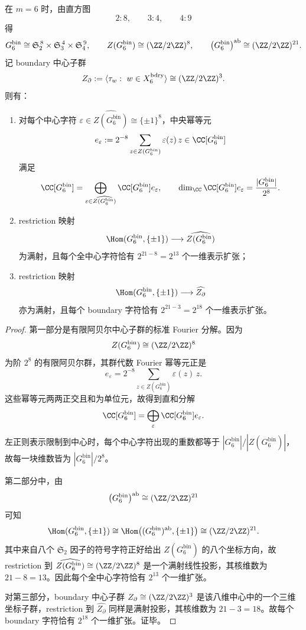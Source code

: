 \begin{theorem}\label{thm:conclusion-window6-full-center-fourier-blocks-and-extensions}
在 \(m=6\) 时，由直方图
\[
2:8,\qquad 3:4,\qquad 4:9
\]
得
\[
G_6^{\mathrm{bin}}\cong \mathfrak S_2^{\,8}\times \mathfrak S_3^{\,4}\times \mathfrak S_4^{\,9},
\qquad
Z(G_6^{\mathrm{bin}})\cong (\ZZ/2\ZZ)^8,
\qquad
\bigl(G_6^{\mathrm{bin}}\bigr)^{\mathrm{ab}}\cong (\ZZ/2\ZZ)^{21}.
\]
记 boundary 中心子群
\[
Z_{\partial}:=\langle \tau_w:\ w\in X_6^{\mathrm{bdry}}\rangle
\cong (\ZZ/2\ZZ)^3.
\]
则有：
\begin{enumerate}
  \item 对每个中心字符 \(\varepsilon\in \widehat{Z(G_6^{\mathrm{bin}})}\cong \{\pm1\}^8\)，中央幂等元
  \[
  e_\varepsilon:=2^{-8}\sum_{z\in Z(G_6^{\mathrm{bin}})}\varepsilon(z)\,z\in \CC[G_6^{\mathrm{bin}}]
  \]
  满足
  \[
  \CC[G_6^{\mathrm{bin}}]
  =
  \bigoplus_{\varepsilon\in \widehat{Z(G_6^{\mathrm{bin}})}} \CC[G_6^{\mathrm{bin}}]e_\varepsilon,
  \qquad
  \dim_\CC \CC[G_6^{\mathrm{bin}}]e_\varepsilon
  =
  \frac{|G_6^{\mathrm{bin}}|}{2^8}.
  \]
  \item restriction 映射
  \[
  \Hom(G_6^{\mathrm{bin}},\{\pm1\})\longrightarrow \widehat{Z(G_6^{\mathrm{bin}})}
  \]
  为满射，且每个全中心字符恰有 \(2^{21-8}=2^{13}\) 个一维表示扩张；
  \item restriction 映射
  \[
  \Hom(G_6^{\mathrm{bin}},\{\pm1\})\longrightarrow \widehat{Z_{\partial}}
  \]
  亦为满射，且每个 boundary 字符恰有 \(2^{21-3}=2^{18}\) 个一维表示扩张。
\end{enumerate}
\end{theorem}
\begin{proof}
第一部分是有限阿贝尔中心子群的标准 Fourier 分解。因为
\[
Z(G_6^{\mathrm{bin}})\cong (\ZZ/2\ZZ)^8
\]
为阶 \(2^8\) 的有限阿贝尔群，其群代数 Fourier 幂等元正是
\[
e_\varepsilon=2^{-8}\sum_{z\in Z(G_6^{\mathrm{bin}})}\varepsilon(z)\,z.
\]
这些幂等元两两正交且和为单位元，故得到直和分解
\[
\CC[G_6^{\mathrm{bin}}]
=
\bigoplus_{\varepsilon}\CC[G_6^{\mathrm{bin}}]e_\varepsilon.
\]
左正则表示限制到中心时，每个中心字符出现的重数都等于 \(|G_6^{\mathrm{bin}}|/|Z(G_6^{\mathrm{bin}})|\)，故每一块维数皆为 \(|G_6^{\mathrm{bin}}|/2^8\)。

第二部分中，由
\[
\bigl(G_6^{\mathrm{bin}}\bigr)^{\mathrm{ab}}\cong (\ZZ/2\ZZ)^{21}
\]
可知
\[
\Hom(G_6^{\mathrm{bin}},\{\pm1\})
\cong
\Hom\bigl((G_6^{\mathrm{bin}})^{\mathrm{ab}},\{\pm1\}\bigr)
\cong
(\ZZ/2\ZZ)^{21}.
\]
其中来自八个 \(\mathfrak S_2\) 因子的符号字符正好给出 \(Z(G_6^{\mathrm{bin}})\) 的八个坐标方向，故 restriction 到 \(\widehat{Z(G_6^{\mathrm{bin}})}\cong (\ZZ/2\ZZ)^8\) 是一个满射线性投影，其核维数为 \(21-8=13\)。因此每个全中心字符恰有 \(2^{13}\) 个一维扩张。

对第三部分，boundary 中心子群 \(Z_{\partial}\cong (\ZZ/2\ZZ)^3\) 是该八维中心中的一个三维坐标子群，restriction 到 \(\widehat{Z_{\partial}}\) 同样是满射投影，其核维数为 \(21-3=18\)。故每个 boundary 字符恰有 \(2^{18}\) 个一维扩张。证毕。
\end{proof}

